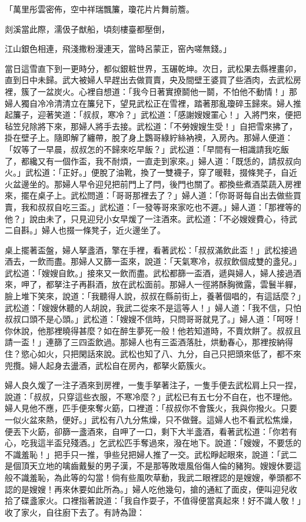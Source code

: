 \begin{showcontents}{}
「萬里彤雲密佈，空中祥瑞飄簾，瓊花片片舞前簷。

剡溪當此際，濡伋子猷船，頃刻樓臺都壓倒，

江山銀色相連，飛淺撒粉漫連天，當時呂蒙正，窑內嗟無錢。」

當日這雪直下到一更時分，都似銀粧世界，玉碾乾坤。次日，武松果去縣裡畫卯，直到日中未歸。武大被婦人早趕出去做買賣，央及間壁王婆買了些酒肉，去武松房裡，簇了一盆炭火。心裡自想道：「我今日著實撩鬬他一鬬，不怕他不動情！」那婦人獨自冷冷清清立在簾兒下，望見武松正在雪裡，踏著那亂瓊碎玉歸來。婦人推起簾子，迎著笑道：「叔叔，寒冷？」武松道：「感謝嫂嫂罣心！」入將門來，便把毡笠兒除將下來，那婦人將手去接。武松道：「不勞嫂嫂生受！」自把雪來拂了，掛在壁子上。隨即解了纏帶，脫了身上鸚哥綠紵絲衲襖，入房內。那婦人便道：「奴等了一早晨，叔叔怎的不歸來吃早飯？」武松道：「早間有一相識請我吃飯了，都纔又有一個作盃，我不耐煩，一直走到家來。」婦人道：「既恁的，請叔叔向火。」武松道：「正好。」便脫了油靴，換了一雙襪子，穿了暖鞋，掇條凳子，自近火盆邊坐的。那婦人早令迎兒把前門上了閂，後門也關了。都換些煮酒菜蔬入房裡來，擺在桌子上。武松問道：「哥哥那裡去了？」婦人道：「你哥哥每自出去做些買賣，我和叔叔自吃三盃。」武松道：「一發等哥來家吃也不遲。」婦人道：「那裡等的他？」說由未了，只見迎兒小女早煖了一注酒來。武松道：「不必嫂嫂費心，待武二自斟。」婦人也掇一條凳子，近火邊坐了。

桌上擺著盃盤，婦人拏盞酒，擎在手裡，看著武松：「叔叔滿飲此盃！」武松接過酒去，一飲而盡。那婦人又篩一盃來，說道：「天氣寒冷，叔叔飲個成雙的盞兒。」武松道：「嫂嫂自飲。」接來又一飲而盡。武松都篩一盃酒，遞與婦人，婦人接過酒來，呷了，都拏注子再斟酒，放在武松面前。那婦人一徑將酥胸微露，雲鬟半軃，臉上堆下笑來，說道：「我聽得人說，叔叔在縣前街上，養著個唱的，有這話麼？」武松道：「嫂嫂休聽的人胡說，我武二從來不是這等人！」婦人道：「我不信，只怕叔叔口頭不是心頭。」武松道：「嫂嫂不信時，只問哥哥就見了。」婦人道：「呵呀！你休說，他那裡曉得甚麼？如在醉生夢死一般！他若知道時，不賣炊餅了。叔叔且請一盃！」連篩了三四盃飲過。那婦人也有三盃酒落肚，烘動春心，那裡按納得住？慾心如火，只把閑話來說。武松也知了八、九分，自己只把頭來低了，都不來兜攬。婦人起身去盪酒，武松自在房內，都拏火筯簇火。

婦人良久煖了一注子酒來到房裡，一隻手拏著注子，一隻手便去武松肩上只一捏，說道：「叔叔，只穿這些衣服，不寒冷麼？」武松已有五七分不自在，也不理他。婦人見他不應，匹手便來奪火筯，口裡道：「叔叔你不會簇火，我與你撥火。只要一似火盆來熱，便好。」武松有八九分焦燥，只不做聲。這婦人也不看武松焦燥，便丟下火筯，卻篩一盞酒來，自呷了一口，剩下大半盞酒，看著武松道：「你若有心，吃我這半盃兒殘酒。」乞武松匹手奪過來，潑在地下。說道：「嫂嫂，不要恁的不識羞恥！」把手只一推，爭些兒把婦人推了一交。武松睜起眼來，說道：「武二是個頂天立地的噙齒戴髮的男子漢，不是那等敗壞風俗傷人倫的豬狗。嫂嫂休要這般不識羞恥，為此等的勾當！倘有些風吹草動，我武二眼裡認的是嫂嫂，拳頭都不認的是嫂嫂！再來休要如此所為。」婦人吃他幾句，搶的通紅了面皮，便叫迎兒收拾了碟盞家火。口裡指著說道：「我自作耍子，不值得便當真起來！好不識人敬！」收了家火，自往廚下去了。有詩為證：


\end{showcontents}
